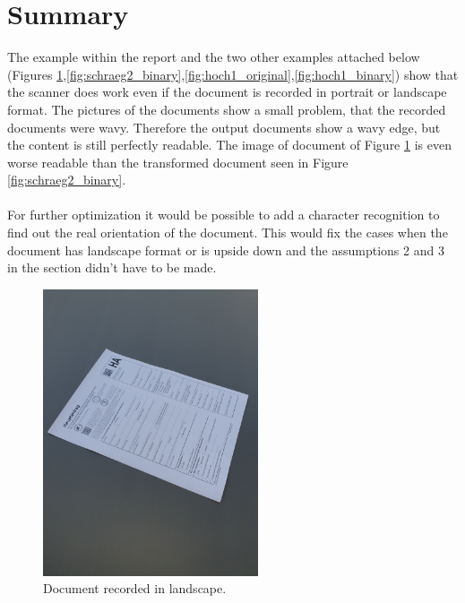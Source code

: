 \documentclass[twocolumn,10pt]{asme2ej}
\begin{document}
\section{Summary}
The example within the report and the two other examples attached below (Figures \ref{fig:schraeg2_original},\ref{fig:schraeg2_binary},\ref{fig:hoch1_original},\ref{fig:hoch1_binary}) show that the scanner does work even if the document is recorded in portrait or landscape format. The pictures of the documents show a small problem, that the recorded documents were wavy. Therefore the output documents show a wavy edge, but the content is still perfectly readable. The image of document of Figure \ref{fig:schraeg2_original} is even worse readable than the transformed document seen in Figure \ref{fig:schraeg2_binary}.\\\\
For further optimization it would be possible to add a character recognition to find out the real orientation of the document. This would fix the cases when the document has landscape format or is upside down and the assumptions 2 and 3 in the  section didn't have to be made.


\begin{figure}[H]
    \centerline{\includegraphics[width=2.5in]{output/schraeg_2_1_original.jpg}}
    \caption{Document recorded in landscape.}
    \label{fig:schraeg2_original}
\end{figure}
\end{document}
